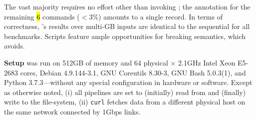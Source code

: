 \documentclass[letterpaper,twocolumn,10pt]{article}
\newcommand{\ie}{{\em i.e.}, }
\newcommand{\heading}[1]{\vspace{4pt}\noindent\textbf{#1}\enspace}
\newcommand{\ttt}[1]{\texttt{#1}}
\newcommand{\todo}[1]{\hl{#1}\xspace}
\newcommand{\kk}[1]{[{\color{magenta}kk: #1}]}
\begin{document}
The vast majority requires no effort other than invoking \sys;
  the annotation for the remaining \todo{6} commands ($<3\%$) amounts to a single record.
% 
In terms of correctness, \sys's results over multi-GB inputs are identical to the sequential for all benchmarks.
Scripts feature ample opportunities for breaking semantics, which \sys avoids.




\heading{Setup}
\sys was run on 512GB of memory and 64 physical $\times$ 2.1GHz Intel Xeon E5-2683 cores, Debian 4.9.144-3.1, GNU Coreutils 8.30-3, GNU Bash 5.0.3(1), and Python 3.7.3---without any special configuration in hardware or software.
Except as otherwise noted,
  (i) all pipelines are set to (initially) read from and (finally) write to the file-system,
  (ii) \ttt{curl} fetches data from a different physical host on the same network connected by 1Gbps links.
\end{document}
